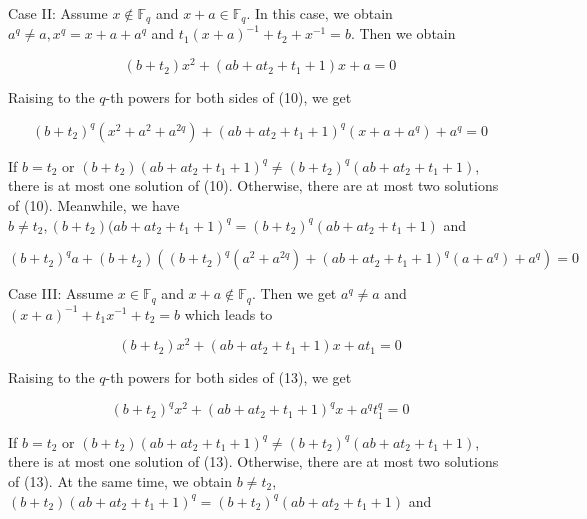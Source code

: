\documentclass[10pt]{article}
\begin{document}
Case II: Assume $x \notin \mathbb{F}_{q}$ and $x+a \in \mathbb{F}_{q}$. In this case, we obtain $a^{q} \neq a, x^{q}=x+a+a^{q}$ and $t_{1}(x+ a)^{-1}+t_{2}+x^{-1}=b$. Then we obtain


\begin{equation*}
\left(b+t_{2}\right) x^{2}+\left(a b+a t_{2}+t_{1}+1\right) x+a=0 \tag{10}
\end{equation*}


Raising to the $q$-th powers for both sides of (10), we get


\begin{equation*}
\left(b+t_{2}\right)^{q}\left(x^{2}+a^{2}+a^{2 q}\right)+\left(a b+a t_{2}+t_{1}+1\right)^{q}\left(x+a+a^{q}\right)+a^{q}=0 \tag{11}
\end{equation*}


If $b=t_{2}$ or $\left(b+t_{2}\right)\left(a b+a t_{2}+t_{1}+1\right)^{q} \neq\left(b+t_{2}\right)^{q}\left(a b+a t_{2}+t_{1}+1\right)$, there is at most one solution of (10). Otherwise, there are at most two solutions of (10). Meanwhile, we have $b \neq t_{2},\left(b+t_{2}\right)(a b+ \left.a t_{2}+t_{1}+1\right)^{q}=\left(b+t_{2}\right)^{q}\left(a b+a t_{2}+t_{1}+1\right)$ and


\begin{equation*}
\left(b+t_{2}\right)^{q} a+\left(b+t_{2}\right)\left(\left(b+t_{2}\right)^{q}\left(a^{2}+a^{2 q}\right)+\left(a b+a t_{2}+t_{1}+1\right)^{q}\left(a+a^{q}\right)+a^{q}\right)=0 \tag{12}
\end{equation*}


Case III: Assume $x \in \mathbb{F}_{q}$ and $x+a \notin \mathbb{F}_{q}$. Then we get $a^{q} \neq a$ and $(x+a)^{-1}+t_{1} x^{-1}+t_{2}=b$ which leads to


\begin{equation*}
\left(b+t_{2}\right) x^{2}+\left(a b+a t_{2}+t_{1}+1\right) x+a t_{1}=0 \tag{13}
\end{equation*}


Raising to the $q$-th powers for both sides of (13), we get


\begin{equation*}
\left(b+t_{2}\right)^{q} x^{2}+\left(a b+a t_{2}+t_{1}+1\right)^{q} x+a^{q} t_{1}^{q}=0 \tag{14}
\end{equation*}


If $b=t_{2}$ or $\left(b+t_{2}\right)\left(a b+a t_{2}+t_{1}+1\right)^{q} \neq\left(b+t_{2}\right)^{q}\left(a b+a t_{2}+t_{1}+1\right)$, there is at most one solution of (13). Otherwise, there are at most two solutions of (13). At the same time, we obtain $b \neq t_{2}$, $\left(b+t_{2}\right)\left(a b+a t_{2}+t_{1}+1\right)^{q}=\left(b+t_{2}\right)^{q}\left(a b+a t_{2}+t_{1}+1\right)$ and
\end{document}
